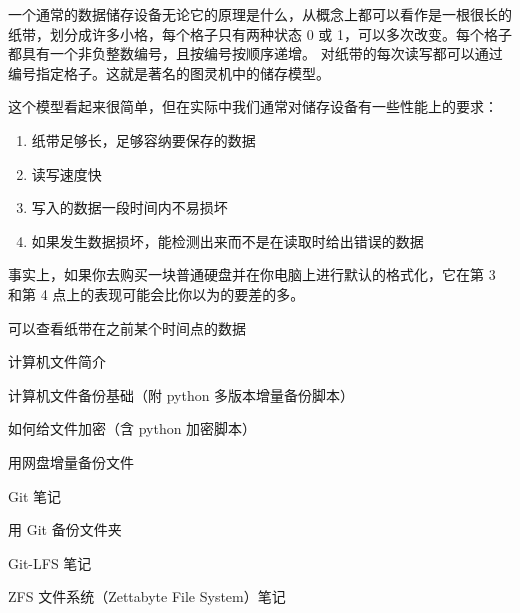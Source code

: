 
\begin{issues}
\issueDraft
\end{issues}

一个通常的数据储存设备无论它的原理是什么，从概念上都可以看作是一根很长的纸带，划分成许多小格，每个格子只有两种状态 0 或 1，可以多次改变。每个格子都具有一个非负整数编号，且按编号按顺序递增。 对纸带的每次读写都可以通过编号指定格子。这就是著名的图灵机中的储存模型。

这个模型看起来很简单，但在实际中我们通常对储存设备有一些性能上的要求：
\begin{enumerate}
\item 纸带足够长，足够容纳要保存的数据
\item 读写速度快
\item 写入的数据一段时间内不易损坏
\item 如果发生数据损坏，能检测出来而不是在读取时给出错误的数据
\end{enumerate}

事实上，如果你去购买一块普通硬盘并在你电脑上进行默认的格式化，它在第 3 和第 4 点上的表现可能会比你以为的要差的多。 


可以查看纸带在之前某个时间点的数据

计算机文件简介

计算机文件备份基础（附 python 多版本增量备份脚本）

如何给文件加密（含 python 加密脚本）

用网盘增量备份文件

Git 笔记

用 Git 备份文件夹

Git-LFS 笔记

ZFS 文件系统（Zettabyte File System）笔记
